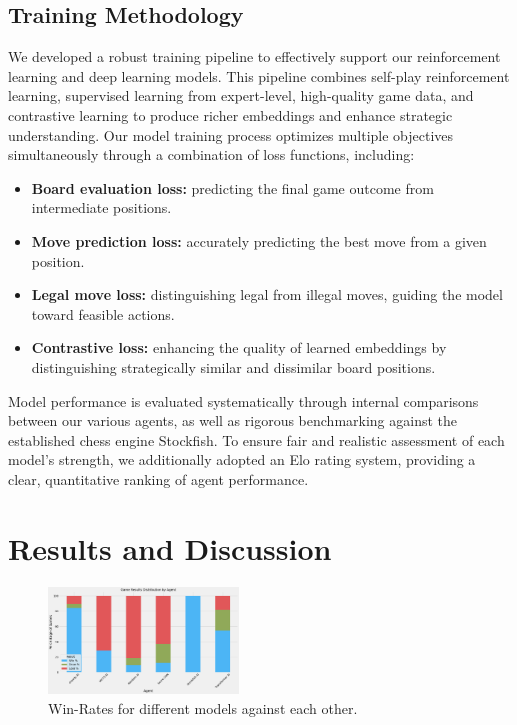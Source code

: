 \documentclass[journal, a4paper]{IEEEtran}
\begin{document}
\subsection{Training Methodology}
\noindent We developed a robust training pipeline to effectively support our reinforcement learning and deep learning models. This pipeline combines self-play reinforcement learning, supervised learning from expert-level, high-quality game data, and contrastive learning to produce richer embeddings and enhance strategic understanding.
Our model training process optimizes multiple objectives simultaneously through a combination of loss functions, including:
\begin{itemize}
    \item \textbf{Board evaluation loss:} predicting the final game outcome from intermediate positions.
    \item \textbf{Move prediction loss:} accurately predicting the best move from a given position.
    \item \textbf{Legal move loss:} distinguishing legal from illegal moves, guiding the model toward feasible actions.
    \item \textbf{Contrastive loss:} enhancing the quality of learned embeddings by distinguishing strategically similar and dissimilar board positions.
\end{itemize}
Model performance is evaluated systematically through internal comparisons between our various agents, as well as rigorous benchmarking against the established chess engine Stockfish. To ensure fair and realistic assessment of each model’s strength, we additionally adopted an Elo rating system, providing a clear, quantitative ranking of agent performance.

\section{Results and Discussion}
\label{sec:results}

\begin{figure}[H]
    \centering
    \includegraphics[width=0.45\textwidth]{fig/win_rates.png}
    \caption{Win-Rates for different models against each other.}
    \label{fig:win_rates}
\end{figure}
\end{document}
